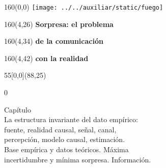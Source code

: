 \documentclass[shownotes,aspectratio=169]{beamer}
\begin{document}
\color{black!85}
\large

 

\begin{frame}

\begin{textblock}{160}(0,0)
\texttt{[image: ../../auxiliar/static/fuego]}
\end{textblock}

\begin{textblock}{160}(4,26)
\LARGE \textcolor{black!5}{\fontsize{22}{0}\selectfont \textbf{Sorpresa: el problema}}
\end{textblock}
\begin{textblock}{160}(4,34)
\LARGE \textcolor{black!5}{\fontsize{22}{0}\selectfont \textbf{de la comunicación}}
\end{textblock}
\begin{textblock}{160}(4,42)
\LARGE \textcolor{black!5}{\fontsize{22}{0}\selectfont \textbf{con la realidad}}
\end{textblock}



\begin{textblock}{55}[0,0](88,25)
\begin{turn}{0}
\parbox{7cm}{\sloppy\setlength\parfillskip{0pt}
\textcolor{black!0}{Capítulo \unidad} \\
\small\textcolor{black!5}{\hspace{0.05cm}La estructura invariante del dato empírico:} \\
\small\textcolor{black!5}{\hspace{0.1cm}fuente, realidad causal, señal, canal,} \\ \small\textcolor{black!5}{\hspace{0.05cm}percepción, modelo causal, estimación.} \\
\small\textcolor{black!5}{\hspace{-0.15cm}Base empírica y datos teóricos. Máxima} \\
\small\textcolor{black!5}{\hspace{-0.35cm}incertidumbre y mínima sorpresa. Información.} \\
}
\end{turn}
\end{textblock}


\end{frame}
\end{document}
